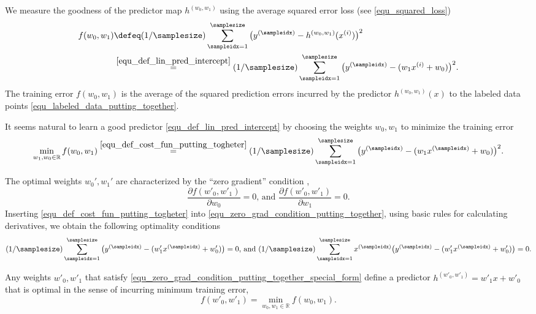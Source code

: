 \documentclass[12pt]{report}
\begin{document}
We measure the goodness of the predictor map $h^{(w_{0},w_{1})}$ 
using the average squared error loss (see \eqref{equ_squared_loss})
\begin{align}
\label{equ_def_cost_fun_putting_togheter}
f(w_{0},w_{1}) & \defeq (1/\samplesize) \sum_{\sampleidx=1}^{\samplesize} \big( y^{(\sampleidx)} - h^{(w_{0},w_{1})}(x^{(i)})  \big)^{2} \nonumber \\
& \stackrel{\eqref{equ_def_lin_pred_intercept}}{=}  (1/\samplesize) \sum_{\sampleidx=1}^{\samplesize} \big( y^{(\sampleidx)} - ( w_{1} x^{(i)} + w_{0}) \big)^{2}. 
\end{align}
The training error $f(w_{0},w_{1})$ is the average of the squared prediction errors incurred 
by the predictor $h^{(w_{0},w_{1})}(x)$ to the labeled data points \eqref{equ_labeled_data_putting_together}. 

It seems natural to learn a good predictor \eqref{equ_def_lin_pred_intercept} by choosing 
the weights $w_{0},w_{1}$ to minimize the training error 
\begin{equation}
\min_{w_{1},w_{0} \in \mathbb{R}} f(w_{0},w_{1}) \stackrel{\eqref{equ_def_cost_fun_putting_togheter}}{=}  (1/\samplesize) \sum_{\sampleidx=1}^{\samplesize} \big( y^{(\sampleidx)} - ( w_{1} x^{(\sampleidx)} + w_{0}) \big)^{2}.
\end{equation} 

The optimal weights $w_{0}',w_{1}'$ are characterized by the ``zero gradient'' condition \cite{}, 
\begin{equation}
\label{equ_zero_grad_condition_putting_together}
\frac{\partial f(w'_{0},w'_{1})}{\partial w_{0}} = 0 \mbox{, and }\frac{\partial f(w'_{0},w'_{1})}{\partial w_{1}} = 0. 
\end{equation} 
Inserting \eqref{equ_def_cost_fun_putting_togheter} into \eqref{equ_zero_grad_condition_putting_together}, 
using basic rules for calculating derivatives, we obtain the following optimality conditions 
\begin{equation}
\label{equ_zero_grad_condition_putting_together_special_form}
 (1/\samplesize) \sum_{\sampleidx=1}^{\samplesize} \big( y^{(\sampleidx)} - ( w'_{1} x^{(\sampleidx)} + w'_{0}) \big)= 0 \mbox{, and } (1/\samplesize) \sum_{\sampleidx=1}^{\samplesize} x^{(\sampleidx)} \big( y^{(\sampleidx)} - ( w'_{1} x^{(\sampleidx)} + w'_{0}) \big) = 0. 
\end{equation} 

Any weights $w'_{0},w'_{1}$ that satisfy \eqref{equ_zero_grad_condition_putting_together_special_form} define 
a predictor $h^{(w'_{0},w'_{1})} = w'_{1}x + w'_{0}$ that is optimal in the sense of incurring minimum training error, 
$$f(w'_{0},w'_{1}) = \min_{w_{0},w_{1} \in \mathbb{R}} f(w_{0},w_{1}).$$
\end{document}
